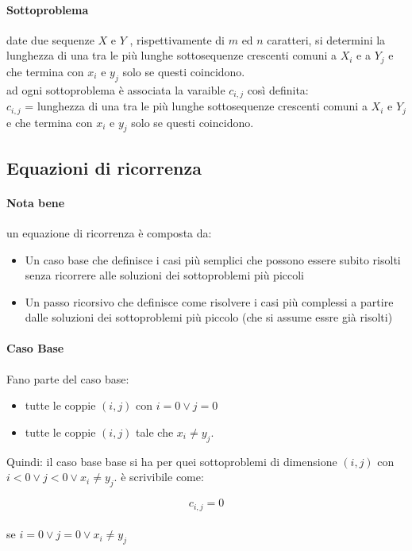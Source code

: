 \paragraph*{Sottoproblema} date due sequenze $X$ e $Y$ , rispettivamente di $m$ ed $n$ caratteri, si determini la lunghezza di una tra le più lunghe sottosequenze crescenti comuni
a $X_i$ e a $Y_j$ e che termina con $x_i$ e $y_j$ solo se questi coincidono.
\\ad ogni sottoproblema è associata la varaible $c_{i,j}$ così definita:
\\ $c_{i,j}$ = lunghezza di una tra le più lunghe sottosequenze crescenti comuni a $X_i$ e $Y_j$ e che termina con $x_i$ e $y_j$ solo se questi coincidono.


\subsection*{Equazioni di ricorrenza}
\paragraph*{Nota bene} %
un equazione di ricorrenza è composta da:
\begin{itemize}
	\item Un caso base che definisce i casi più semplici che possono essere subito risolti senza ricorrere alle soluzioni dei sottoproblemi più piccoli
	\item Un passo ricorsivo che definisce come risolvere i casi più complessi a partire dalle soluzioni dei sottoproblemi più piccolo (che si assume essre già risolti)
\end{itemize}

\paragraph*{Caso Base}
Fano parte del caso base:
\begin{itemize}
	\item tutte le coppie $(i,j)$ con $i = 0 \vee j= 0$
	\item tutte le coppie $(i,j)$ tale che $x_i \neq y_j$.
\end{itemize}
Quindi: il caso base base si ha per quei sottoproblemi di dimensione $(i,j)$ con $i < 0 \vee j < 0 \vee x_i \neq y_j$.
è scrivibile come:
\begin{center}
	$$c_{i,j} = 0$$
	\\se $i=0 \vee j=0 \vee x_i \neq y_j$
\end{center}

